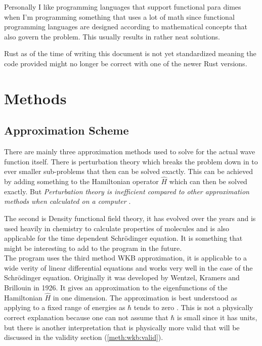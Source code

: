 \documentclass[11pt,DIV=10,final]{scrreprt} %
\begin{document}
Personally I like programming languages that support functional para dimes when I'm programming something that uses a lot of math since functional programming languages are designed according to mathematical concepts that also govern the problem. This usually results in rather neat solutions.

Rust as of the time of writing this document is not yet standardized meaning the code provided might no longer be correct with one of the newer Rust versions.

\chapter{Methods}
\section{Approximation Scheme}
\label{meth:wkb:approximation-scheme}
There are mainly three approximation methods used to solve for the actual wave function itself. There is perturbation theory which breaks the problem down in to ever smaller sub-problems that then can be
solved exactly. This can be achieved by adding something to the Hamiltonian operator $\hat{H}$ which can then be solved exactly. But \textit{Perturbation theory is inefficient compared to other approximation
methods when calculated on a computer} \citep[Introduction]{van2014density}.

The second is Density functional field theory, it has evolved over the years and is used heavily in chemistry to calculate properties of molecules and is also applicable for the time dependent Schrödinger
equation. It is something that might be interesting to add to the program in the future.
\\

The program uses the third method WKB approximation, it is applicable to a wide verity of linear differential equations and works very well in the case of the Schrödinger equation.
Originally it was developed by Wentzel, Kramers and Brillouin in 1926. It gives an approximation to the eigenfunctions of the Hamiltonian $\hat{H}$ in one dimension. The approximation is best
understood as applying to a fixed range of energies as $\hbar$ tends to zero \citep[p.~305]{hall2013quantum}. This is not a physically correct explanation because one can not assume that $\hbar$ is small since it has units, but there is another interpretation that is physically more valid that will be discussed in the validity section (\ref{meth:wkb:valid}).
\end{document}
